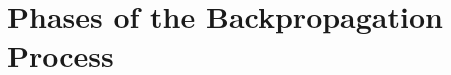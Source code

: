 \documentclass[10pt,a4paper]{article}
\begin{document}
    
    
    
    
    
    
    
    
    
    
    
    
    

    
    

    \appendix
    \section{Phases of the Backpropagation Process} \label{ap:backprop}
    

 

    \printindex
\end{document}
